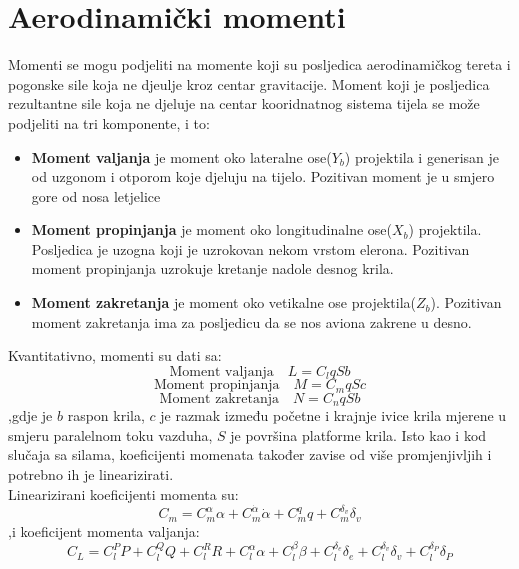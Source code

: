 \section{Aerodinamički momenti}
Momenti se mogu podjeliti na momente koji su posljedica aerodinamičkog tereta i 
pogonske sile koja ne djeulje kroz centar gravitacije. Moment koji je posljedica 
rezultantne sile koja ne djeluje na centar kooridnatnog sistema tijela se može 
podjeliti na tri komponente, i to:
\begin{itemize}
    \item \textbf{Moment valjanja} je moment oko lateralne ose($Y_b$) projektila i generisan 
    je od uzgonom i otporom koje djeluju na tijelo. Pozitivan moment je u smjero gore 
    od nosa letjelice 
    
    \item \textbf{Moment propinjanja} je moment oko longitudinalne ose($X_b$) projektila.
    Posljedica je uzogna koji je uzrokovan nekom vrstom elerona. Pozitivan moment propinjanja uzrokuje kretanje nadole 
    desnog krila.
    
    \item \textbf{Moment zakretanja} je moment oko vetikalne ose projektila($Z_b$). Pozitivan moment zakretanja 
    ima za posljedicu da se nos aviona zakrene u desno. 
\end{itemize}
Kvantitativno, momenti su dati sa:
\begin{equation}
    \text{Moment valjanja} \quad L=C_lqSb
    \label{eq:a1}
 \end{equation}
 \begin{equation}
     \text{Moment propinjanja} \quad M=C_mqSc
     \label{eq:a2}
 \end{equation}
 \begin{equation}
     \text{Moment zakretanja} \quad N=C_nqSb
     \label{eq:a3}
 \end{equation}
 ,gdje je $b$ raspon krila, $c$ je razmak između početne i krajnje ivice krila mjerene 
 u smjeru paralelnom toku vazduha, $S$ je površina platforme krila. 
 Isto kao i kod slučaja sa silama, koeficijenti momenata također zavise od više promjenjivljih 
 i potrebno ih je linearizirati. \\
 Linearizirani koeficijenti momenta  su:
 \begin{equation}
     C_m=C_m^{\alpha}\alpha +C_m^{\dot{\alpha}}\dot{\alpha } + C_m^q q+C_m^{\delta _v}\delta _v
 \end{equation} 
 ,i koeficijent momenta valjanja:
 \begin{equation}
     C_L = C_l^PP+C_l^QQ+C_l^RR +C_l^\alpha \alpha +C_l^\beta \beta + C_l^{\delta _e} \delta _e +C_l^{\delta _v} \delta _v
     +C_l^{\delta _P} \delta _P
 \end{equation}
